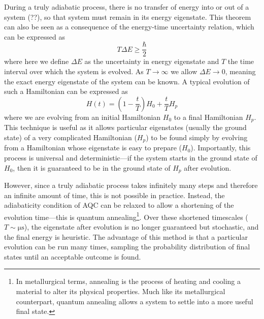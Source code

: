 \documentclass[12pt]{article}
\theoremstyle{definition}
\begin{document}
During a truly adiabatic process, there is no transfer of energy into or out of a system (??), so that system must remain in its energy eigenstate. This theorem can also be seen as a consequence of the energy-time uncertainty relation, which can be expressed as
\begin{equation}
    T\Delta E \ge \frac{\hbar}{2}
    \label{eq:energy-time}
\end{equation}
where here we define $\Delta E$ as the uncertainty in energy eigenstate and $T$ the time interval over which the system is evolved. As $T\to\infty$ we allow $\Delta E\to0$, meaning the exact energy eigenstate of the system can be known. A typical evolution of such a Hamiltonian can be expressed as
\begin{equation}
    H(t)=\left(1- \frac{t}{T}\right)H_0 + \frac{t}{T}H_p
    \label{eq:time-evolution}
\end{equation}
where we are evolving from an initial Hamiltonian $H_0$ to a final Hamiltonian $H_p$.
This technique is useful as it allows particular eigenstates (usually the ground state) of a very complicated Hamiltonian ($H_p$) to be found simply by evolving from a Hamiltonian whose eigenstate is easy to prepare ($H_0$). Importantly, this process is universal and deterministic---if the system starts in the ground state of $H_0$, then it is guaranteed to be in the ground state of $H_p$ after evolution.

However, since a truly adiabatic process takes infinitely many steps and therefore an infinite amount of time, this is not possible in practice. Instead, the adiabaticity condition of AQC can be relaxed to allow a shortening of the evolution time---this is quantum annealing\footnote{In metallurgical terms, annealing is the process of heating and cooling a material to alter its physical properties. Much like its metallurgical counterpart, quantum annealing allows a system to settle into a more useful final state.}. Over these shortened timescales ($T\sim\unit{\us}$), the eigenstate after evolution is no longer guaranteed but stochastic, and the final energy is heuristic. The advantage of this method is that a particular evolution can be run many times, sampling the probability distribution of final states until an acceptable outcome is found.
\end{document}
